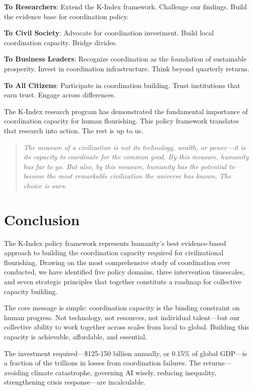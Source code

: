\documentclass[12pt,letterpaper]{article}
\begin{document}
\textbf{To Researchers}: Extend the K-Index framework. Challenge our findings. Build the evidence base for coordination policy.

\textbf{To Civil Society}: Advocate for coordination investment. Build local coordination capacity. Bridge divides.

\textbf{To Business Leaders}: Recognize coordination as the foundation of sustainable prosperity. Invest in coordination infrastructure. Think beyond quarterly returns.

\textbf{To All Citizens}: Participate in coordination building. Trust institutions that earn trust. Engage across differences.

The K-Index research program has demonstrated the fundamental importance of coordination capacity for human flourishing. This policy framework translates that research into action. The rest is up to us.

\begin{quote}
\textit{The measure of a civilization is not its technology, wealth, or power---it is its capacity to coordinate for the common good. By this measure, humanity has far to go. But also, by this measure, humanity has the potential to become the most remarkable civilization the universe has known. The choice is ours.}
\end{quote}

\section{Conclusion}

The K-Index policy framework represents humanity's best evidence-based approach to building the coordination capacity required for civilizational flourishing. Drawing on the most comprehensive study of coordination ever conducted, we have identified five policy domains, three intervention timescales, and seven strategic principles that together constitute a roadmap for collective capacity building.

The core message is simple: coordination capacity is the binding constraint on human progress. Not technology, not resources, not individual talent---but our collective ability to work together across scales from local to global. Building this capacity is achievable, affordable, and essential.

The investment required---\$125-150 billion annually, or 0.15\% of global GDP---is a fraction of the trillions in losses from coordination failures. The returns---avoiding climate catastrophe, governing AI wisely, reducing inequality, strengthening crisis response---are incalculable.
\end{document}
